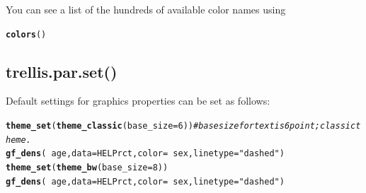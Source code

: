 \documentclass[twoside]{book}\usepackage[]{graphicx}\usepackage[]{xcolor}
\makeatletter
\newcommand{\hlnum}[1]{\textcolor[rgb]{0.686,0.059,0.569}{#1}}%
\newcommand{\hlstr}[1]{\textcolor[rgb]{0.192,0.494,0.8}{#1}}%
\newcommand{\hlcom}[1]{\textcolor[rgb]{0.678,0.584,0.686}{\textit{#1}}}%
\newcommand{\hlopt}[1]{\textcolor[rgb]{0,0,0}{#1}}%
\newcommand{\hlstd}[1]{\textcolor[rgb]{0.345,0.345,0.345}{#1}}%
\newcommand{\hlkwc}[1]{\textcolor[rgb]{0.333,0.667,0.333}{#1}}%
\newcommand{\hlkwd}[1]{\textcolor[rgb]{0.737,0.353,0.396}{\textbf{#1}}}%
\newenvironment{kframe}{%
 \def\at@end@of@kframe{}%
 \ifinner\ifhmode%
  \def\at@end@of@kframe{\end{minipage}}%
  \begin{minipage}{\columnwidth}%
 \fi\fi%
 \def\FrameCommand##1{\hskip\@totalleftmargin \hskip-\fboxsep
 \colorbox{shadecolor}{##1}\hskip-\fboxsep
     \hskip-\linewidth \hskip-\@totalleftmargin \hskip\columnwidth}%
 \MakeFramed {\advance\hsize-\width
   \@totalleftmargin\z@ \linewidth\hsize
   \@setminipage}}%
 {\par\unskip\endMakeFramed%
 \at@end@of@kframe}
\newenvironment{knitrout}{}{} %
\newcommand{\Rindex}[1]{\index{\texttt{#1}}}
\makeatother
\begin{document}
You can see a list of the hundreds of available color names using
\Rindex{colors()}%
\begin{knitrout}
\color{fgcolor}\begin{kframe}
\begin{alltt}
\hlkwd{colors}\hlstd{()}
\end{alltt}
\end{kframe}
\end{knitrout}

\subsection{trellis.par.set()}
Default settings for graphics properties can be set as follows:

\begin{knitrout}
\color{fgcolor}\begin{kframe}
\begin{alltt}
\hlkwd{theme_set}\hlstd{(}\hlkwd{theme_classic}\hlstd{(}\hlkwc{base_size} \hlstd{=} \hlnum{6}\hlstd{))}    \hlcom{# base size for text is 6 point; classic theme.}
\hlkwd{gf_dens}\hlstd{(} \hlopt{~}\hlstd{age,} \hlkwc{data} \hlstd{= HELPrct,} \hlkwc{color} \hlstd{=} \hlopt{~} \hlstd{sex,} \hlkwc{linetype} \hlstd{=} \hlstr{"dashed"}\hlstd{)}
\hlkwd{theme_set}\hlstd{(}\hlkwd{theme_bw}\hlstd{(}\hlkwc{base_size} \hlstd{=} \hlnum{8}\hlstd{))}
\hlkwd{gf_dens}\hlstd{(} \hlopt{~}\hlstd{age,} \hlkwc{data} \hlstd{= HELPrct,} \hlkwc{color} \hlstd{=} \hlopt{~} \hlstd{sex,} \hlkwc{linetype} \hlstd{=} \hlstr{"dashed"}\hlstd{)}
\end{alltt}
\end{kframe}


\end{knitrout}
\end{document}
